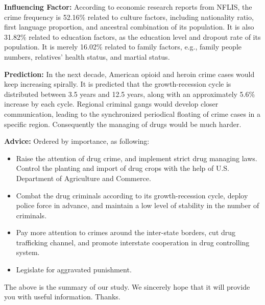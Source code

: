 \documentclass{mcmthesis}
\begin{document}
\textbf{Influencing Factor:} According to economic research reports from NFLIS, the crime frequency is 52.16\% related to culture factors, including nationality ratio, first language proportion, and ancestral combination of its population. It is also 31.82\% related to education factors, as the education level and dropout rate of its population. It is merely 16.02\% related to family factors, e.g., family people numbers, relatives' health status, and martial status.

\textbf{Prediction:} In the next decade, American opioid and heroin crime cases would keep increasing spirally. It is predicted that the growth-recession cycle is distributed between 3.5 years and 12.5 years, along with an approximately 5.6\% increase by each cycle. Regional criminal gangs would develop closer communication, leading to the synchronized periodical floating of crime cases in a specific region. Consequently the managing of drugs would be much harder.

\textbf{Advice:} Ordered by importance, as following:
\begin{itemize}
	\item Raise the attention of drug crime, and implement strict drug managing laws. Control the planting and import of drug crops with the help of U.S. Department of Agriculture and Commerce.
	\item Combat the drug criminals according to its growth-recession cycle, deploy police force in advance, and maintain a low level of stability in the number of criminals.
	\item Pay more attention to crimes around the inter-state borders, cut drug trafficking channel, and promote interstate cooperation in drug controlling system.
	\item Legislate for aggravated punishment.
\end{itemize}

The above is the summary of our study. We sincerely hope that it will provide you with
useful information. Thanks.
\end{document}
